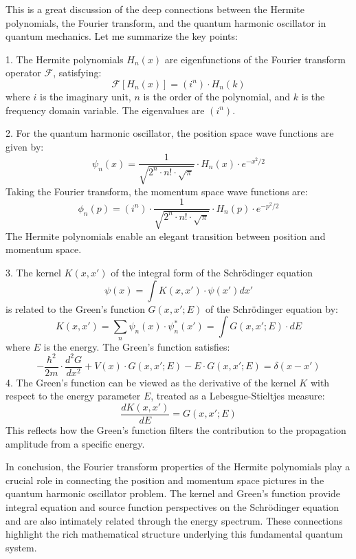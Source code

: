 \documentclass{article}
\begin{document}
This is a great discussion of the deep connections between the Hermite
polynomials, the Fourier transform, and the quantum harmonic oscillator in
quantum mechanics. Let me summarize the key points:

1. The Hermite polynomials $H_n (x)$ are eigenfunctions of the Fourier
transform operator $\mathcal{F}$, satisfying:
\begin{equation}
  \mathcal{F} [H_n (x)] = (i^n) \cdot H_n (k)
\end{equation}
where $i$ is the imaginary unit, $n$ is the order of the polynomial, and $k$
is the frequency domain variable. The eigenvalues are $(i^n)$.

2. For the quantum harmonic oscillator, the position space wave functions are
given by:
\begin{equation}
  \psi_n (x) = \frac{1}{\sqrt{2^n \cdot n! \cdot \sqrt{\pi}}} \cdot H_n (x)
  \cdot e^{- x^2 / 2}
\end{equation}
Taking the Fourier transform, the momentum space wave functions are:
\begin{equation}
  \phi_n (p) = (i^n) \cdot \frac{1}{\sqrt{2^n \cdot n! \cdot \sqrt{\pi}}}
  \cdot H_n (p) \cdot e^{- p^2 / 2}
\end{equation}
The Hermite polynomials enable an elegant transition between position and
momentum space.

3. The kernel $K (x, x')$ of the integral form of the Schr{\"o}dinger equation
\begin{equation}
  \psi (x) = \int K (x, x') \cdot \psi (x') dx'
\end{equation}
is related to the Green's function $G (x, x' ; E)$ of the Schr{\"o}dinger
equation by:
\begin{equation}
  K (x, x') = \sum_n \psi_n (x) \cdot \psi^{\ast}_n (x') = \int G (x, x' ; E)
  \cdot dE
\end{equation}
where $E$ is the energy. The Green's function satisfies:
\begin{equation}
  - \frac{\hbar^2}{2 m} \cdot \frac{d^2 G}{dx^2} + V (x) \cdot G (x, x' ; E) -
  E \cdot G (x, x' ; E) = \delta (x - x')
\end{equation}
4. The Green's function can be viewed as the derivative of the kernel $K$ with
respect to the energy parameter $E$, treated as a Lebesgue-Stieltjes measure:
\begin{equation}
  \frac{dK (x, x')}{dE} = G (x, x' ; E)
\end{equation}
This reflects how the Green's function filters the contribution to the
propagation amplitude from a specific energy.

In conclusion, the Fourier transform properties of the Hermite polynomials
play a crucial role in connecting the position and momentum space pictures in
the quantum harmonic oscillator problem. The kernel and Green's function
provide integral equation and source function perspectives on the
Schr{\"o}dinger equation and are also intimately related through the energy
spectrum. These connections highlight the rich mathematical structure
underlying this fundamental quantum system.
\end{document}
